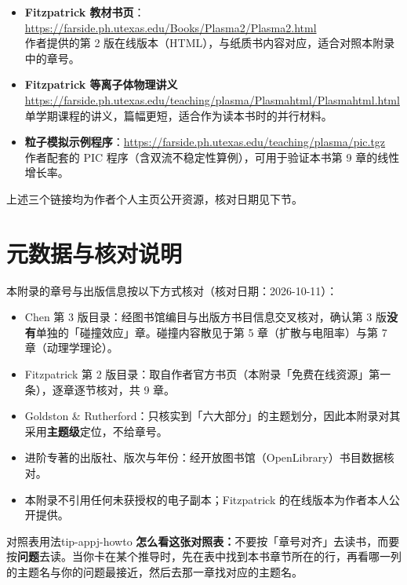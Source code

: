 \begin{itemize}
\item \textbf{Fitzpatrick 教材书页}：\url{https://farside.ph.utexas.edu/Books/Plasma2/Plasma2.html}\\
作者提供的第 2 版在线版本（HTML），与纸质书内容对应，适合对照本附录中的章号。
\item \textbf{Fitzpatrick 等离子体物理讲义}\\
\url{https://farside.ph.utexas.edu/teaching/plasma/Plasmahtml/Plasmahtml.html}\\
单学期课程的讲义，篇幅更短，适合作为读本书时的并行材料。
\item \textbf{粒子模拟示例程序}：\url{https://farside.ph.utexas.edu/teaching/plasma/pic.tgz}\\
作者配套的 PIC 程序（含双流不稳定性算例），可用于验证本书第 9 章的线性增长率。
\end{itemize}

上述三个链接均为作者个人主页公开资源，核对日期见下节。


\section{元数据与核对说明}

本附录的章号与出版信息按以下方式核对（核对日期：2026-10-11）：

\begin{itemize}
\item Chen 第 3 版目录：经图书馆编目与出版方书目信息交叉核对，确认第 3 版\textbf{没有}单独的「碰撞效应」章。碰撞内容散见于第 5 章（扩散与电阻率）与第 7 章（动理学理论）。
\item Fitzpatrick 第 2 版目录：取自作者官方书页（本附录「免费在线资源」第一条），逐章逐节核对，共 9 章。
\item Goldston \& Rutherford：只核实到「六大部分」的主题划分，因此本附录对其采用\textbf{主题级}定位，不给章号。
\item 进阶专著的出版社、版次与年份：经开放图书馆（OpenLibrary）书目数据核对。
\item 本附录不引用任何未获授权的电子副本；Fitzpatrick 的在线版本为作者本人公开提供。
\end{itemize}

\begin{tip}{对照表用法}{tip-appj-howto}
\textbf{怎么看这张对照表：}不要按「章号对齐」去读书，而要按\textbf{问题}去读。当你卡在某个推导时，先在表中找到本书章节所在的行，再看哪一列的主题名与你的问题最接近，然后去那一章找对应的主题名。
\end{tip}
